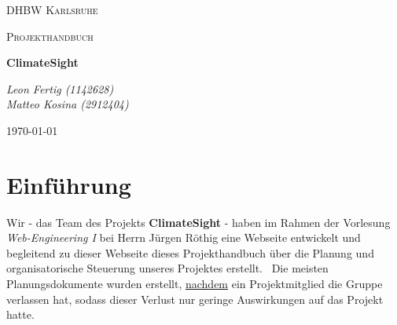 \documentclass[12pt]{article}
\begin{document}
\begin{titlepage}
	\centering
	{\scshape\LARGE DHBW Karlsruhe\par}
	\vspace{1cm}
	{\scshape\Large Projekthandbuch\par}
	\vspace{1.5cm}
	{\huge\bfseries ClimateSight\par}
	\vspace{2cm}
	{\Large\itshape Leon Fertig (1142628)\\Matteo Kosina (2912404)\par}
	\vfill
	\vfill

	{\large \today\par}
\end{titlepage}

\tableofcontents
\thispagestyle{empty}
\newpage

\setcounter{page}{1}

\section{Einführung}
Wir - das Team des Projekts {\bf ClimateSight} - haben im Rahmen der Vorlesung {\it Web-Engineering I} bei Herrn Jürgen Röthig eine Webseite entwickelt und begleitend zu dieser Webseite dieses Projekthandbuch über die Planung und organisatorische Steuerung unseres Projektes erstellt. \
Die meisten Planungsdokumente wurden erstellt, \underline{nachdem} ein Projektmitglied die Gruppe verlassen hat, sodass dieser Verlust nur geringe Auswirkungen auf das Projekt hatte.
\end{document}
